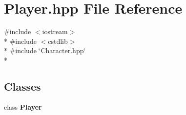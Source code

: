 \section{Player.\-hpp File Reference}
\label{_player_8hpp}
{\ttfamily \#include $<$iostream$>$}\\*
{\ttfamily \#include $<$cstdlib$>$}\\*
{\ttfamily \#include \char`\"{}Character.\-hpp\char`\"{}}\\*
\subsection*{Classes}
\begin{DoxyCompactItemize}
\item 
class {\bf Player}
\end{DoxyCompactItemize}
